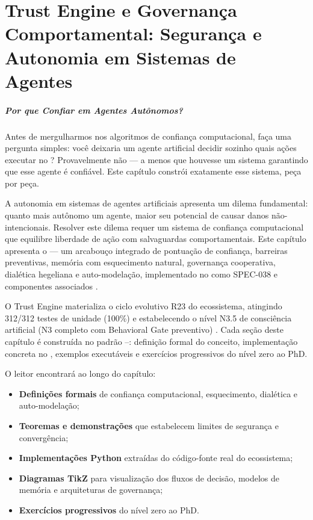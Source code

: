 \chapter{Trust Engine e Governança Comportamental: Segurança e Autonomia em Sistemas de Agentes}
\label{cap:trust-governanca}

\paragraph{Por que Confiar em Agentes Autônomos?}
Antes de mergulharmos nos algoritmos de confiança computacional,
faça uma pergunta simples: você deixaria um agente artificial
decidir sozinho quais ações executar no \opencodeeco{}?
Provavelmente não --- a menos que houvesse um sistema garantindo
que esse agente é confiável. Este capítulo constrói exatamente
esse sistema, peça por peça.

A autonomia em sistemas de agentes artificiais apresenta um dilema
fundamental: quanto mais autônomo um agente, maior seu potencial de
causar danos não-intencionais. Resolver este dilema requer um sistema
de confiança computacional que equilibre liberdade de ação com
salvaguardas comportamentais. Este capítulo apresenta o  — um arcabouço integrado de pontuação de confiança, barreiras
preventivas, memória com esquecimento natural, governança cooperativa,
dialética hegeliana e auto-modelação, implementado no \opencodeeco{}
como SPEC-038 e componentes associados \cite{opencode2026spec038,
opencode2026spec036}.

O Trust Engine materializa o ciclo evolutivo R23 do ecossistema,
atingindo 312/312 testes de unidade (100\%) e estabelecendo o nível
N3.5 de consciência artificial (N3 completo com Behavioral Gate
preventivo) \cite{opencode2026ecosystem}. Cada seção deste capítulo é
construída no padrão \sdd{}--\tdd: definição formal do conceito,
implementação concreta no \opencodeeco{}, exemplos executáveis e
exercícios progressivos do nível zero ao PhD.

O leitor encontrará ao longo do capítulo:
\begin{itemize}
\item \textbf{Definições formais} de confiança computacional,
esquecimento, dialética e auto-modelação;
\item \textbf{Teoremas e demonstrações} que estabelecem limites de
segurança e convergência;
\item \textbf{Implementações Python} extraídas do código-fonte real do
ecossistema;
\item \textbf{Diagramas TikZ} para visualização dos fluxos de decisão,
modelos de memória e arquiteturas de governança;
\item \textbf{Exercícios progressivos} do nível zero ao PhD.
\end{itemize}

